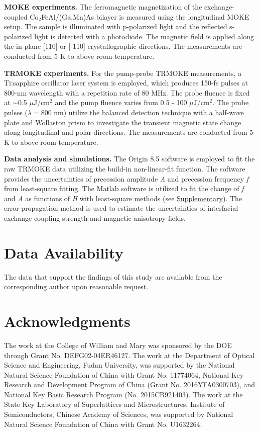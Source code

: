 \documentclass[%
 reprint,
superscriptaddress,
 amsmath,amssymb,
 aps,
prl,
]{revtex4-1}
\begin{document}
\textbf{MOKE experiments.} The ferromagnetic magnetization of the exchange-coupled Co$_{2}$FeAl/(Ga,Mn)As bilayer is measured using the longitudinal MOKE setup. The sample is illuminated with p-polarized light and the reflected s-polarized light is detected with a photodiode. The magnetic field is applied along the in-plane [110] or [-110] crystallographic directions. The measurements are conducted from 5 K to above room temperature. 

\textbf{TRMOKE experiments.} For the pump-probe TRMOKE measurements, a Ti:sapphire oscillator laser system is employed, which produces 150-fs pulses at 800-nm wavelength with a repetition rate of 80 MHz. The probe fluence is fixed at $\sim$0.5 $\mu$J/cm$^{2}$ and the pump fluence varies from 0.5 - 100 $\mu$J/cm$^{2}$. The probe pulses ($\lambda=800$ nm) utilize the balanced detection technique with a half-wave plate and Wollaston prism to investigate the transient magnetic state change along longitudinal and polar directions. The measurements are conducted from 5 K to above room temperature.

\textbf{Data analysis and simulations.} The Origin 8.5 software is employed to fit the raw TRMOKE data utilizing the build-in non-linear-fit function. The software provides the uncertainties of precession amplitude \textit{A} and precession frequency \textit{f} from least-square fitting. The Matlab software is utilized to fit the change of \textit{f} and \textit{A} as functions of \textit{H} with least-square methods (see \hyperref[sec:Supplementary]{Supplementary}). The error-propagation method is used to estimate the uncertainties of interfacial exchange-coupling strength and magnetic anisotropy fields.

\section{\label{sec:Contributions}Data Availability}
The data that support the findings of this study are available from the corresponding author upon reasonable request. 

\section{\label{sec:Acknowledge}Acknowledgments}

The work at the College of William and Mary was sponsored by the DOE through Grant No. DEFG02-04ER46127. The work at the Department of Optical Science and Engineering, Fudan University, was supported by the National Natural Science Foundation of China with Grant No. 11774064, National Key Research and Development Program of China (Grant No. 2016YFA0300703), and National Key Basic Research Program (No. 2015CB921403). The work at the State Key Laboratory of Superlattices and Microstructures, Institute of Semiconductors, Chinese Academy of Sciences, was supported by National Natural Science Foundation of China with Grant No. U1632264.
\end{document}
